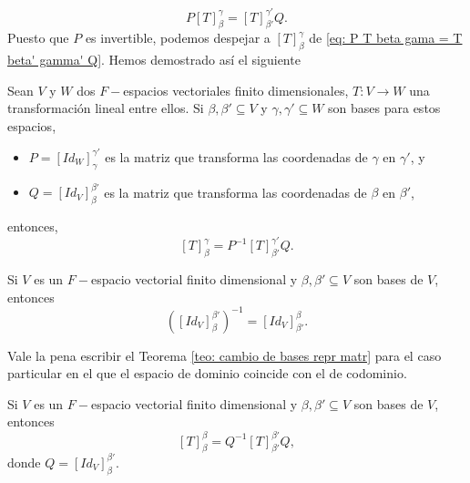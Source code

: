 \begin{equation}
	\label{eq: P T beta gama = T beta' gamma' Q}
	P[T]_{\beta}^{\gamma} = [T]_{\beta'}^{\gamma'} Q.
\end{equation}
Puesto que $P$ es invertible, podemos despejar a $[T]_{\beta}^{\gamma}$
de \eqref{eq: P T beta gama = T beta' gamma' Q}.
Hemos demostrado así el siguiente 
\begin{teo}
	\label{teo: cambio de bases repr matr}
Sean $V$ y $W$ dos $F-$espacios vectoriales finito dimensionales,
$T: V \longrightarrow W$ una transformación lineal entre ellos.
Si $\beta, \beta' \subseteq V$ y $\gamma, \gamma' \subseteq W$ son 
bases para estos espacios, 
\begin{itemize}
	\item $P = [Id_{W}]_{\gamma}^{\gamma'}$ es la matriz que transforma
	las coordenadas de $\gamma$ en $\gamma'$, y 
	\item $Q = [Id_{V}]_{\beta}^{\beta'}$ es la matriz que transforma
	las coordenadas de $\beta$ en $\beta'$,
\end{itemize}
entonces,
\begin{equation}
	\label{eq: T beta gama = P inv T beta' gamma' Q}
	[T]_{\beta}^{\gamma} = P^{-1} [T]_{\beta'}^{\gamma'} Q.
\end{equation}
\end{teo}

\begin{obs}
Si $V$ es un $F-$espacio vectorial finito dimensional y 
$\beta, \beta' \subseteq V$ son bases de $V$, entonces
\begin{equation}
	\label{eq: inversa de id beta a beta' es con bases en otro orden}
	([Id_{V}]_{\beta}^{\beta'})^{-1} = [Id_{V}]_{\beta'}^{\beta}.
\end{equation}
\end{obs}


Vale la pena escribir el Teorema 
\ref{teo: cambio de bases repr matr} para el caso particular 
en el que el espacio de dominio coincide con el de codominio.

\begin{cor}
	\label{cor: T de V en V cambio de base}
Si $V$ es un $F-$espacio vectorial finito dimensional y 
$\beta, \beta' \subseteq V$ son bases de $V$, entonces
\begin{equation}
	\label{eq: T de V en V dos bases}
	[T]_{\beta}^{\beta} = Q^{-1} [T]_{\beta'}^{\beta'} Q,
\end{equation}
donde $Q= [Id_{V}]_{\beta}^{\beta'}$.
\end{cor}

